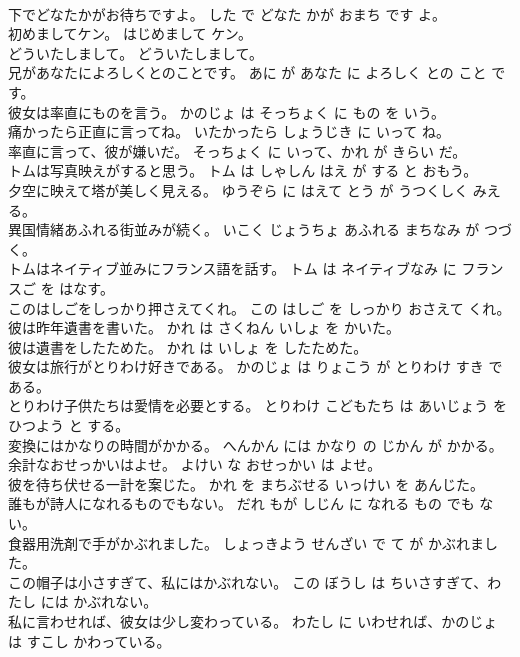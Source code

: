 \documentclass[8pt]{extreport}
\begin{document}
\begin{CJK}{UTF8}{min}
\\	下でどなたかがお待ちですよ。	した で どなた かが おまち です よ。	
\\	初めましてケン。	はじめまして ケン。	
\\	どういたしまして。	どういたしまして。	
\\	兄があなたによろしくとのことです。	あに が あなた に よろしく との こと です。	
\\	彼女は率直にものを言う。	かのじょ は そっちょく に もの を いう。	
\\	痛かったら正直に言ってね。	いたかったら しょうじき に いって ね。	
\\	率直に言って、彼が嫌いだ。	そっちょく に いって、かれ が きらい だ。	
\\	トムは写真映えがすると思う。	トム は しゃしん はえ が する と おもう。	
\\	夕空に映えて塔が美しく見える。	ゆうぞら に はえて とう が うつくしく みえる。	
\\	異国情緒あふれる街並みが続く。	いこく じょうちょ あふれる まちなみ が つづく。	
\\	トムはネイティブ並みにフランス語を話す。	トム は ネイティブなみ に フランスご を はなす。	
\\	このはしごをしっかり押さえてくれ。	この はしご を しっかり おさえて くれ。	
\\	彼は昨年遺書を書いた。	かれ は さくねん いしょ を かいた。	
\\	彼は遺書をしたためた。	かれ は いしょ を したためた。	
\\	彼女は旅行がとりわけ好きである。	かのじょ は りょこう が とりわけ すき である。	
\\	とりわけ子供たちは愛情を必要とする。	とりわけ こどもたち は あいじょう を ひつよう と する。	
\\	変換にはかなりの時間がかかる。	へんかん には かなり の じかん が かかる。	
\\	余計なおせっかいはよせ。	よけい な おせっかい は よせ。	
\\	彼を待ち伏せる一計を案じた。	かれ を まちぶせる いっけい を あんじた。	
\\	誰もが詩人になれるものでもない。	だれ もが しじん に なれる もの でも ない。	
\\	食器用洗剤で手がかぶれました。	しょっきよう せんざい で て が かぶれました。	
\\	この帽子は小さすぎて、私にはかぶれない。	この ぼうし は ちいさすぎて、わたし には かぶれない。	
\\	私に言わせれば、彼女は少し変わっている。	わたし に いわせれば、かのじょ は すこし かわっている。	

\end{CJK}
\end{document}

